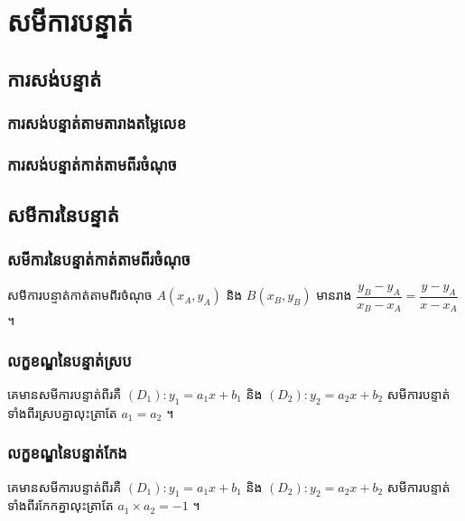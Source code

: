 \chapter{សមីការបន្ទាត់}


\section{ការសង់បន្ទាត់}
\subsection{ការសង់បន្ទាត់តាមតារាងតម្លៃលេខ}
\subsection{ការសង់បន្ទាត់កាត់តាមពីរចំណុច}

\section{សមីការនៃបន្ទាត់}
\subsection{សមីការនៃបន្ទាត់កាត់តាមពីរចំណុច}
\begin{general}
សមីការបន្ទាត់កាត់តាមពីរចំណុច $A(x_A,y_A)$ និង $B(x_B,y_B)$  មានរាង $\dfrac{y_B-y_A}{x_B-x_A}=\dfrac{y-y_A}{x-x_A}$។
\end{general}
\subsection{លក្ខខណ្ឌនៃបន្ទាត់ស្រប}

\begin{general}
គេមានសមីការបន្ទាត់ពីរគឺ $(D_1):y_1=a_1x+b_1$ និង  $(D_2):y_2=a_2x+b_2$ សមីការបន្ទាត់ទាំងពីរស្របគ្នាលុះត្រាតែ $a_1=a_2$ ។
\end{general}
\subsection{លក្ខខណ្ឌនៃបន្ទាត់កែង}

\begin{general}
គេមានសមីការបន្ទាត់ពីរគឺ $(D_1):y_1=a_1x+b_1$ និង  $(D_2):y_2=a_2x+b_2$ សមីការបន្ទាត់ទាំងពីរកែកគ្នាលុះត្រាតែ $a_1\times a_2=-1$ ។
\end{general}

